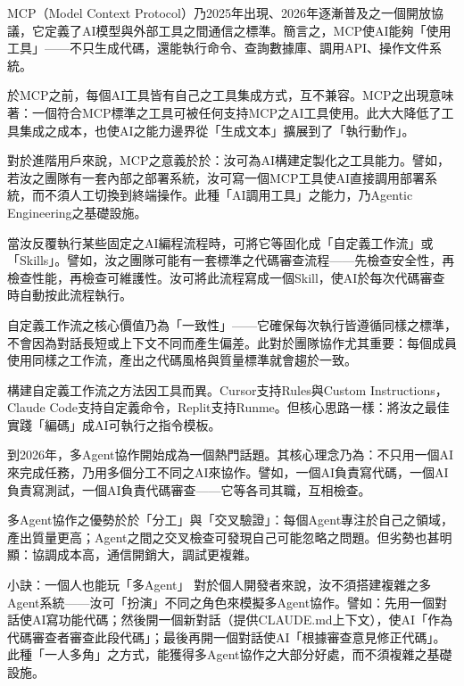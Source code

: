 


MCP（Model Context Protocol）乃2025年出現、2026年逐漸普及之一個開放協議，它定義了AI模型與外部工具之間通信之標準。簡言之，MCP使AI能夠「使用工具」——不只生成代碼，還能執行命令、查詢數據庫、調用API、操作文件系統。

於MCP之前，每個AI工具皆有自己之工具集成方式，互不兼容。MCP之出現意味著：一個符合MCP標準之工具可被任何支持MCP之AI工具使用。此大大降低了工具集成之成本，也使AI之能力邊界從「生成文本」擴展到了「執行動作」。

對於進階用戶來說，MCP之意義於於：汝可為AI構建定製化之工具能力。譬如，若汝之團隊有一套內部之部署系統，汝可寫一個MCP工具使AI直接調用部署系統，而不須人工切換到終端操作。此種「AI調用工具」之能力，乃Agentic Engineering之基礎設施。


當汝反覆執行某些固定之AI編程流程時，可將它等固化成「自定義工作流」或「Skills」。譬如，汝之團隊可能有一套標準之代碼審查流程——先檢查安全性，再檢查性能，再檢查可維護性。汝可將此流程寫成一個Skill，使AI於每次代碼審查時自動按此流程執行。

自定義工作流之核心價值乃為「一致性」——它確保每次執行皆遵循同樣之標準，不會因為對話長短或上下文不同而產生偏差。此對於團隊協作尤其重要：每個成員使用同樣之工作流，產出之代碼風格與質量標準就會趨於一致。

構建自定義工作流之方法因工具而異。Cursor支持Rules與Custom Instructions，Claude Code支持自定義命令，Replit支持Runme。但核心思路一樣：將汝之最佳實踐「編碼」成AI可執行之指令模板。


到2026年，多Agent協作開始成為一個熱門話題。其核心理念乃為：不只用一個AI來完成任務，乃用多個分工不同之AI來協作。譬如，一個AI負責寫代碼，一個AI負責寫測試，一個AI負責代碼審查——它等各司其職，互相檢查。

多Agent協作之優勢於於「分工」與「交叉驗證」：每個Agent專注於自己之領域，產出質量更高；Agent之間之交叉檢查可發現自己可能忽略之問題。但劣勢也甚明顯：協調成本高，通信開銷大，調試更複雜。

\begin{tcbinfo}{小訣：一個人也能玩「多Agent」}
對於個人開發者來說，汝不須搭建複雜之多Agent系統——汝可「扮演」不同之角色來模擬多Agent協作。譬如：先用一個對話使AI寫功能代碼；然後開一個新對話（提供CLAUDE.md上下文），使AI「作為代碼審查者審查此段代碼」；最後再開一個對話使AI「根據審查意見修正代碼」。此種「一人多角」之方式，能獲得多Agent協作之大部分好處，而不須複雜之基礎設施。

\end{tcbinfo}

